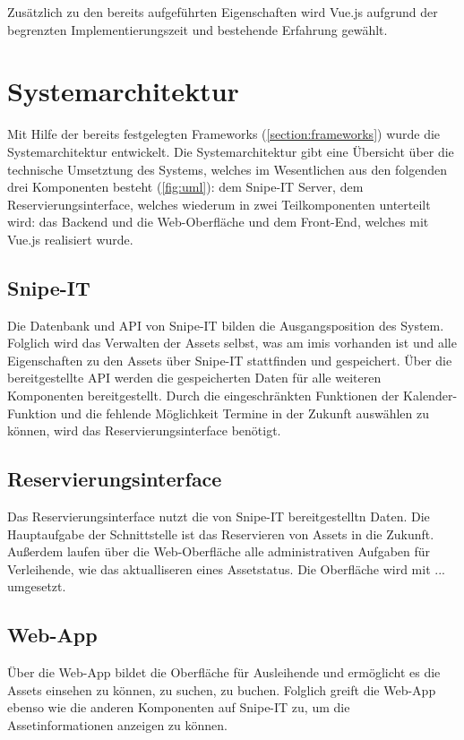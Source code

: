 Zusätzlich zu den bereits aufgeführten Eigenschaften wird Vue.js aufgrund der
begrenzten Implementierungszeit und bestehende Erfahrung gewählt.

\section{Systemarchitektur}
Mit Hilfe der bereits festgelegten Frameworks (\ref{section:frameworks}) wurde
die Systemarchitektur entwickelt. Die Systemarchitektur gibt eine Übersicht über
die technische Umsetztung des Systems, welches im Wesentlichen aus den folgenden
drei Komponenten besteht (\ref{fig:uml}): dem Snipe-IT Server, dem
Reservierungsinterface, welches wiederum in zwei Teilkomponenten unterteilt
wird: das Backend und die Web-Oberfläche und dem Front-End, welches mit Vue.js
realisiert wurde.

\subsection{Snipe-IT}
Die Datenbank und API von Snipe-IT bilden die Ausgangsposition des System.
Folglich wird das Verwalten der Assets selbst, was am \ac{imis} vorhanden ist
und alle Eigenschaften zu den Assets über Snipe-IT stattfinden und gespeichert.
Über die bereitgestellte API werden die gespeicherten Daten für alle weiteren
Komponenten bereitgestellt. Durch die eingeschränkten Funktionen der
Kalender-Funktion und die fehlende Möglichkeit Termine in der Zukunft auswählen
zu können, wird das Reservierungsinterface benötigt.

\subsection{Reservierungsinterface}
Das Reservierungsinterface nutzt die von Snipe-IT bereitgestelltn Daten. Die
Hauptaufgabe der Schnittstelle ist das Reservieren von Assets in die Zukunft.
Außerdem laufen über die Web-Oberfläche alle administrativen Aufgaben für
Verleihende, wie das aktualliseren eines Assetstatus. Die Oberfläche wird mit
... umgesetzt.

\subsection{Web-App}
Über die Web-App bildet die Oberfläche für Ausleihende und ermöglicht es die
Assets einsehen zu können, zu suchen, zu buchen. Folglich greift die Web-App
ebenso wie die anderen Komponenten auf Snipe-IT zu, um die Assetinformationen
anzeigen zu können.

